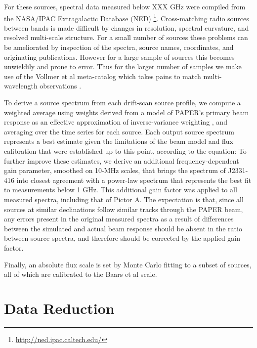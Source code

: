 \documentclass[preprint]{aastex}
\begin{document}
For these sources, spectral data measured below XXX GHz were compiled from 
the NASA/IPAC Extragalactic Database (NED)
\footnote{\url{http://ned.ipac.caltech.edu/}}. Cross-matching radio sources
between bands is made difficult by changes in resolution, spectral curvature,
and resolved multi-scale structure.  For a small number of sources these
problems can be ameliorated by inspection of the spectra, source names,
coordinates,  and originating publications. However for a large sample of
sources this becomes unwieldily and prone to error. Thus for the larger number
of samples we make use of the Vollmer et al meta-catalog which takes pains to
match multi-wavelength observations \citep{Vollmer:2010p6422}.


To derive a source spectrum from each drift-scan source profile, we compute a weighted average using
weights derived from a model of
PAPER's primary beam response as an effective approximation of inverse-variance weighting
\citep{pober_et_al2012}, and averaging over the time series for each source.  Each output source spectrum
represents a best estimate given the limitations of the beam model and flux calibration that were established
up to this point, according to the equation:
To further improve these estimates, we derive an additional frequency-dependent gain parameter,
smoothed on 10-MHz scales,
that brings the spectrum of J2331-416 into closest agreement with a power-law spectrum
that represents the best fit to measurements below 1 GHz.
This additional gain factor was applied to all measured spectra, including that
of Pictor A.  The expectation is that, since all sources at similar declinations follow similar tracks 
through the PAPER beam, any errors present in the original measured spectra as a result of differences between
the simulated and actual beam response should be absent in the ratio between source spectra, and therefore
should be corrected by the applied gain factor.

Finally,
an absolute flux scale is set
by Monte Carlo fitting to a subset of sources, all of which are calibrated to
the Baars et al scale. 

 
 \section{Data Reduction}
 \label{sec:Observations}
\end{document}
